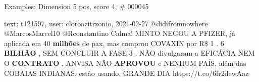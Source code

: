 \begin{frame}{Examples: Dimension 5 pos, score 4, \# 000045}
\footnotesize
\begin{exampleblock}{text: t121597, user: cloroazitrzonio, 2021-02-27}
@didifromnowhere @MarcosMarcel10 @Rconstantino Calma! MINTO NEGOU A PFIZER, já 
aplicada em 40 \textbf{milhões} de pax, mas comprou COVAXIN por R\$ 1 . 6 
\textbf{BILHÃO} , SEM CONCLUIR A FASE 3 . NÃO divulgaram a EFICÁCIA NEM O 
\textbf{CONTRATO} , ANVISA NÃO \textbf{APROVOU} e NENHUM PAÍS, além das COBAIAS 
INDIANAS, estão usando. GRANDE DIA  
https://t.co/6fr2dewAaz 
\end{exampleblock}
\end{frame}
